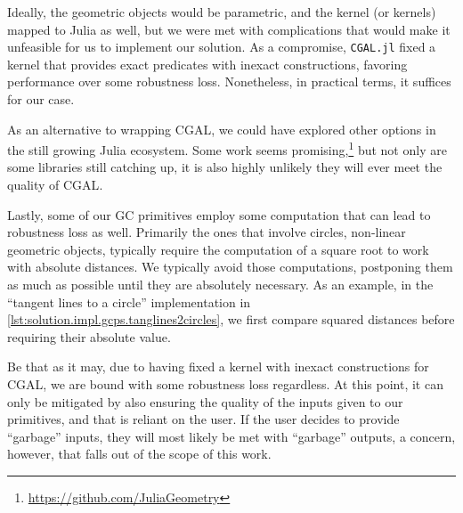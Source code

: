 Ideally, the geometric objects would be parametric, and the kernel (or kernels)
mapped to Julia as well, but we were met with complications that would make it
unfeasible for us to implement our solution.  As a compromise, \texttt{CGAL.jl}
fixed a kernel that provides exact predicates with inexact constructions,
favoring performance over some robustness loss.  Nonetheless, in practical
terms, it suffices for our case.

As an alternative to wrapping \ac{CGAL}, we could have explored other options in
the still growing Julia ecosystem.  Some work seems
promising,\footnote{\url{https://github.com/JuliaGeometry}} but not only are
some libraries still catching up, it is also highly unlikely they will ever meet
the quality of \ac{CGAL}.

Lastly, some of our \ac{GC} primitives employ some computation that can lead to
robustness loss as well.  Primarily the ones that involve circles, non-linear
geometric objects, typically require the computation of a square root to work
with absolute distances.  We typically avoid those computations, postponing them
as much as possible until they are absolutely necessary.  As an example, in the
``tangent lines to a circle'' implementation in
\cref{lst:solution.impl.gcps.tanglines2circles}, we first compare squared
distances before requiring their absolute value.

Be that as it may, due to having fixed a kernel with inexact constructions for
\ac{CGAL}, we are bound with some robustness loss regardless.  At this point, it
can only be mitigated by also ensuring the quality of the inputs given to our
primitives, and that is reliant on the user.  If the user decides to provide
``garbage'' inputs, they will most likely be met with ``garbage'' outputs, a
concern, however, that falls out of the scope of this work.
